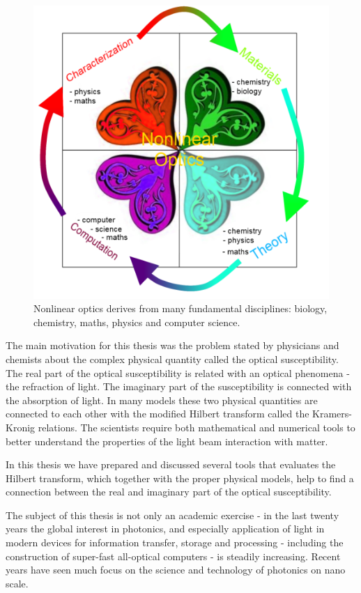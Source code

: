 \documentclass[12pt,twoside,a4paper]{article}
\numberwithin{equation}{subsection}
\numberwithin{figure}{subsection}
\begin{document}
\begin{figure} 
 \includegraphics{img/nlo.png}
 \caption{Nonlinear optics derives from many fundamental disciplines: biology, chemistry, maths, physics and computer science.
 \label{fig:practical_nlo}}
\end{figure}


The main motivation for this thesis was the problem stated by physicians and chemists about the complex physical quantity called the
optical susceptibility. The real part of the optical susceptibility is related with an optical phenomena - the refraction of light. The
imaginary part of the susceptibility is connected with the absorption of light. In many models these two physical quantities are connected
to each other with the modified Hilbert transform called the Kramers-Kronig relations. The scientists require both mathematical and
numerical tools to better understand the properties of the light beam interaction with matter. 

In this thesis we have prepared and discussed several tools that evaluates the Hilbert transform, which together with the proper physical
models, help to find a connection between the real and imaginary part of the optical susceptibility.   

The subject of this thesis is not only an academic exercise - in the last twenty years the global interest in photonics, and
especially application of light in modern devices for information transfer, storage and processing - including the construction of super-fast
all-optical computers - is steadily increasing. Recent years have seen much focus on the science and technology of photonics on
nano scale. 
\end{document}
